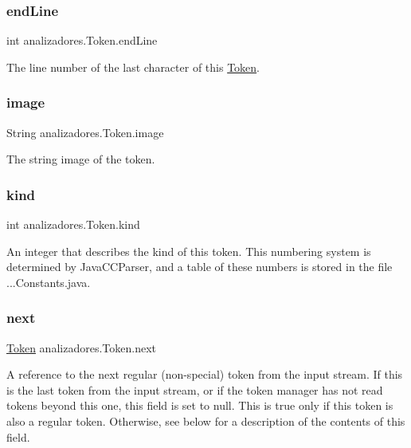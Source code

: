 \subsubsection{\texorpdfstring{end\+Line}{endLine}}
{\footnotesize\ttfamily int analizadores.\+Token.\+end\+Line}

The line number of the last character of this \mbox{\hyperlink{classanalizadores_1_1_token}{Token}}. \mbox{\label{classanalizadores_1_1_token_a3636b082aca90dcbd24df1790f847590}} 
\subsubsection{\texorpdfstring{image}{image}}
{\footnotesize\ttfamily String analizadores.\+Token.\+image}

The string image of the token. \mbox{\label{classanalizadores_1_1_token_ac5615b76c325a751915025aa28a03cfc}} 
\subsubsection{\texorpdfstring{kind}{kind}}
{\footnotesize\ttfamily int analizadores.\+Token.\+kind}

An integer that describes the kind of this token. This numbering system is determined by Java\+C\+C\+Parser, and a table of these numbers is stored in the file ...Constants.\+java. \mbox{\label{classanalizadores_1_1_token_a7177e7c2f1387bb011e8602a52077126}} 
\subsubsection{\texorpdfstring{next}{next}}
{\footnotesize\ttfamily \mbox{\hyperlink{classanalizadores_1_1_token}{Token}} analizadores.\+Token.\+next}

A reference to the next regular (non-\/special) token from the input stream. If this is the last token from the input stream, or if the token manager has not read tokens beyond this one, this field is set to null. This is true only if this token is also a regular token. Otherwise, see below for a description of the contents of this field. \mbox{\label{classanalizadores_1_1_token_a05c70c5bef44be3c3126ed5c267978fd}} 
